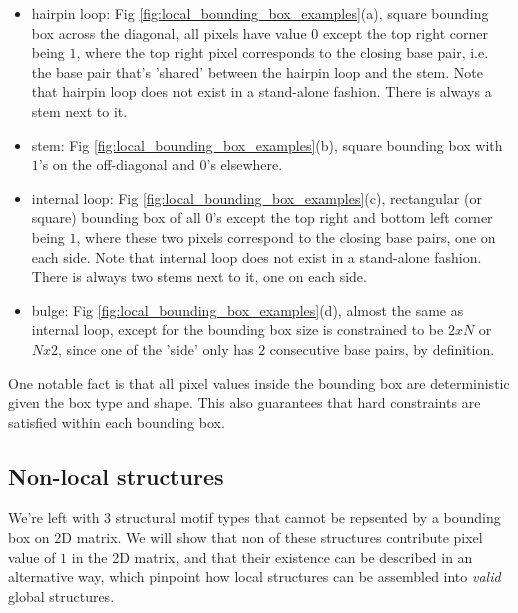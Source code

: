 \documentclass[12pt]{article}
\begin{document}
\begin{itemize}
    \item hairpin loop: Fig \ref{fig:local_bounding_box_examples}(a),
    square bounding box across the diagonal, all pixels have value $0$ except the top right corner being $1$,
    where the top right pixel corresponds to the
    closing base pair, i.e. the base pair that's 'shared' between the hairpin loop and the stem.
    Note that hairpin loop does not exist in a stand-alone fashion.
    There is always a stem next to it.

    \item stem: Fig \ref{fig:local_bounding_box_examples}(b),
    square bounding box with $1$'s on the off-diagonal and $0$'s elsewhere.


    \item internal loop: Fig \ref{fig:local_bounding_box_examples}(c),
    rectangular (or square) bounding box of all $0$'s except the top right and bottom left corner being $1$,
    where these two pixels correspond to the closing base pairs, one on each side.
    Note that internal loop does not exist in a stand-alone fashion.
    There is always two stems next to it, one on each side.

    \item bulge: Fig \ref{fig:local_bounding_box_examples}(d),
    almost the same as internal loop, except for the bounding box size is constrained
    to be $2xN$ or $Nx2$, since one of the 'side' only has $2$ consecutive base pairs, by definition.
\end{itemize}

One notable fact is that all pixel values inside the bounding box are deterministic given the box type and shape.
This also guarantees that hard constraints are satisfied within each bounding box.

\subsection{Non-local structures}

We're left with $3$ structural motif types that cannot be repsented by a bounding box on 2D matrix.
We will show that non of these structures contribute pixel value of $1$ in the 2D matrix,
and that their existence can be described in an alternative way,
which pinpoint how local structures can be assembled into \textit{valid} global structures.
\end{document}
